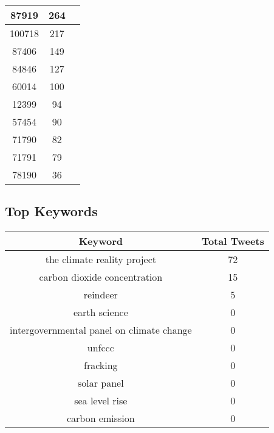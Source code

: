 \documentclass{article}\usepackage[T1]{fontenc}
\begin{document}
\begin{tabular}{|c|c|c|}
 \hline
87919 & 264\\ 
 \hline
100718 & 217\\ 
 \hline
87406 & 149\\ 
 \hline
84846 & 127\\ 
 \hline
60014 & 100\\ 
 \hline
12399 & 94\\ 
 \hline
57454 & 90\\ 
 \hline
71790 & 82\\ 
 \hline
71791 & 79\\ 
 \hline
78190 & 36\\ 
 \hline
\end{tabular}\subsection*{Top Keywords}\begin{tabular}{|c|c|}         \hline         Keyword & Total Tweets \\ 
 \hline
the climate reality project & 72\\ 
 \hline
carbon dioxide concentration & 15\\ 
 \hline
reindeer & 5\\ 
 \hline
earth science & 0\\ 
 \hline
intergovernmental panel on climate change & 0\\ 
 \hline
unfccc & 0\\ 
 \hline
fracking & 0\\ 
 \hline
solar panel & 0\\ 
 \hline
sea level rise & 0\\ 
 \hline
carbon emission & 0\\ 
 \hline
\end{tabular}
\end{document}
